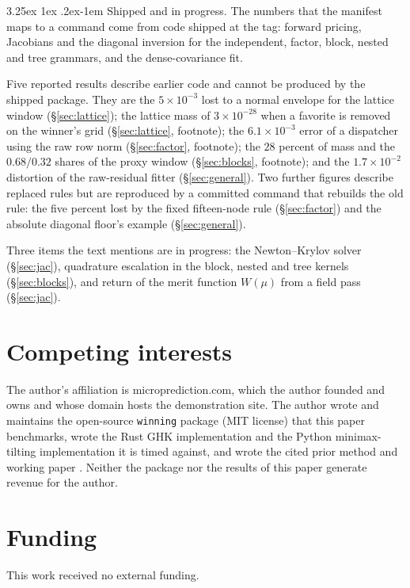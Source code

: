 \documentclass[11pt]{article}
\makeatletter
\renewcommand\paragraph{\@startsection{paragraph}{4}{\z@}%
  {3.25ex \@plus1ex \@minus.2ex}{-1em}%
  {\normalfont\normalsize\itshape}}
\makeatother
\begin{document}
\paragraph{Shipped and in progress.} The numbers that the manifest maps
to a command come from code shipped at the tag: forward pricing,
Jacobians and the diagonal inversion for the independent, factor, block,
nested and tree grammars, and the dense-covariance fit.

Five reported results describe earlier code and cannot be produced by
the shipped package. They are the $5\times10^{-3}$ lost to a normal
envelope for the lattice window (\S\ref{sec:lattice}); the lattice mass
of $3\times10^{-28}$ when a favorite is removed on the winner's grid
(\S\ref{sec:lattice}, footnote); the $6.1\times10^{-3}$ error of a
dispatcher using the raw row norm (\S\ref{sec:factor}, footnote); the
$28$ percent of mass and the $0.68/0.32$ shares of the proxy window
(\S\ref{sec:blocks}, footnote); and the $1.7\times10^{-2}$ distortion of
the raw-residual fitter (\S\ref{sec:general}). Two further figures
describe replaced rules but are reproduced by a committed command that
rebuilds the old rule: the five percent lost by the fixed fifteen-node
rule (\S\ref{sec:factor}) and the absolute diagonal floor's example
(\S\ref{sec:general}).

Three items the text mentions are in
progress:
the Newton--Krylov solver (\S\ref{sec:jac}), quadrature escalation in
the block, nested and tree kernels (\S\ref{sec:blocks}), and return of
the merit function $W(\mu)$ from a field pass (\S\ref{sec:jac}).

\section*{Competing interests}
The author's affiliation is microprediction.com, which the author founded
and owns and whose domain hosts the demonstration site. The author wrote and maintains the open-source
\texttt{winning} package (MIT license) that this paper benchmarks, wrote
the Rust GHK implementation and the Python minimax-tilting
implementation it is timed against, and wrote the cited prior method
\citep{cotton2021} and working paper \citep{cottonsurvey}. Neither the
package nor the results of this paper generate revenue for the author.

\section*{Funding}
This work received no external funding.
\end{document}
